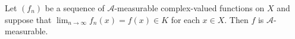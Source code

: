 Let $(f_n)$ be a sequence of $\mathcal{A}$-measurable complex-valued functions on $X$ and suppose that $\lim_{n \to \infty} f_n(x) = f(x) \in K$ for each $x \in X$. Then $f$ is $\mathcal{A}$-measurable.